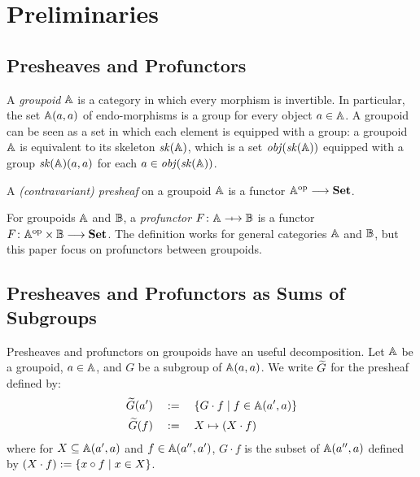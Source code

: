 \section{Preliminaries}

\subsection{Presheaves and Profunctors}

\newcommand{\Object}{\mathit{obj}}
\newcommand{\Skeleton}{\mathit{sk}}

A \emph{groupoid} \( \mathbb{A} \) is a category in which every morphism is invertible.
In particular, the set \( \mathbb{A}(a,a) \) of endo-morphisms is a group for every object \( a \in \mathbb{A} \).
A groupoid can be seen as a set in which each element is equipped with a group: a groupoid \( \mathbb{A} \) is equivalent to its skeleton \( \Skeleton(\Grp) \), which is a set \( \Object(\Skeleton(\Grp)) \) equipped with a group \( \Skeleton(\Grp)(a, a) \) for each \( a \in \Object(\Skeleton(\Grp)) \).

A \emph{(contravariant) presheaf} on a groupoid \( \mathbb{A} \) is a functor \( \mathbb{A}^{\mathrm{op}} \longrightarrow \mathbf{Set} \).

For groupoids \( \mathbb{A} \) and \( \mathbb{B} \), a \emph{profunctor} \( F \colon \Grp \profarrow \Grpb \) is a functor \( F \colon \mathbb{A}^{\mathrm{op}} \times \mathbb{B} \longrightarrow \mathbf{Set} \).
The definition works for general categories \( \mathbb{A} \) and \( \mathbb{B} \), but this paper focus on profunctors between groupoids.


\subsection{Presheaves and Profunctors as Sums of Subgroups}
Presheaves and profunctors on groupoids have an useful decomposition.
Let \( \mathbb{A} \) be a groupoid, \( a \in \mathbb{A} \), and \( G \) be a subgroup of \( \mathbb{A}(a,a) \).
We write \( \widetilde{G} \) for the presheaf defined by:
\begin{align*}
    \widetilde{G}(a')
    &\quad:=\quad
    \{ G \cdot f \mid f \in \mathbb{A}(a', a) \}
    \\
    \widetilde{G}(f)
    &\quad:=\quad
    X \mapsto (X \cdot f)
\end{align*}
where for \( X \subseteq \mathbb{A}(a', a) \) and \( f \in \mathbb{A}(a'', a') \), \( G \cdot f \) is the subset of \( \mathbb{A}(a'', a) \) defined by \( (X \cdot f) := \{ x \circ f \mid x \in X \} \).

